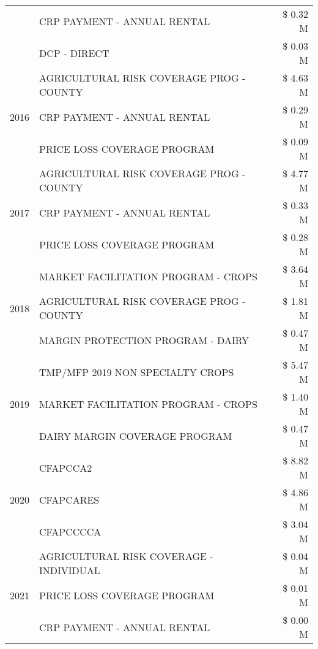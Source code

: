 \begin{tabular}{llr}
 & CRP PAYMENT - ANNUAL RENTAL & \$ 0.32 M \\
 & DCP - DIRECT & \$ 0.03 M \\
\cline{1-3}
\multirow[t]{3}{*}{2016} & AGRICULTURAL RISK COVERAGE PROG - COUNTY & \$ 4.63 M \\
 & CRP PAYMENT - ANNUAL RENTAL & \$ 0.29 M \\
 & PRICE LOSS COVERAGE PROGRAM & \$ 0.09 M \\
\cline{1-3}
\multirow[t]{3}{*}{2017} & AGRICULTURAL RISK COVERAGE PROG - COUNTY & \$ 4.77 M \\
 & CRP PAYMENT - ANNUAL RENTAL & \$ 0.33 M \\
 & PRICE LOSS COVERAGE PROGRAM & \$ 0.28 M \\
\cline{1-3}
\multirow[t]{3}{*}{2018} & MARKET FACILITATION PROGRAM - CROPS & \$ 3.64 M \\
 & AGRICULTURAL RISK COVERAGE PROG - COUNTY & \$ 1.81 M \\
 & MARGIN PROTECTION PROGRAM - DAIRY & \$ 0.47 M \\
\cline{1-3}
\multirow[t]{3}{*}{2019} & TMP/MFP 2019 NON SPECIALTY CROPS & \$ 5.47 M \\
 & MARKET FACILITATION PROGRAM - CROPS & \$ 1.40 M \\
 & DAIRY MARGIN COVERAGE PROGRAM & \$ 0.47 M \\
\cline{1-3}
\multirow[t]{3}{*}{2020} & CFAPCCA2 & \$ 8.82 M \\
 & CFAPCARES & \$ 4.86 M \\
 & CFAPCCCCA & \$ 3.04 M \\
\cline{1-3}
\multirow[t]{3}{*}{2021} & AGRICULTURAL RISK COVERAGE - INDIVIDUAL & \$ 0.04 M \\
 & PRICE LOSS COVERAGE PROGRAM & \$ 0.01 M \\
 & CRP PAYMENT - ANNUAL RENTAL & \$ 0.00 M \\
\cline{1-3}
\bottomrule
\end{tabular}
